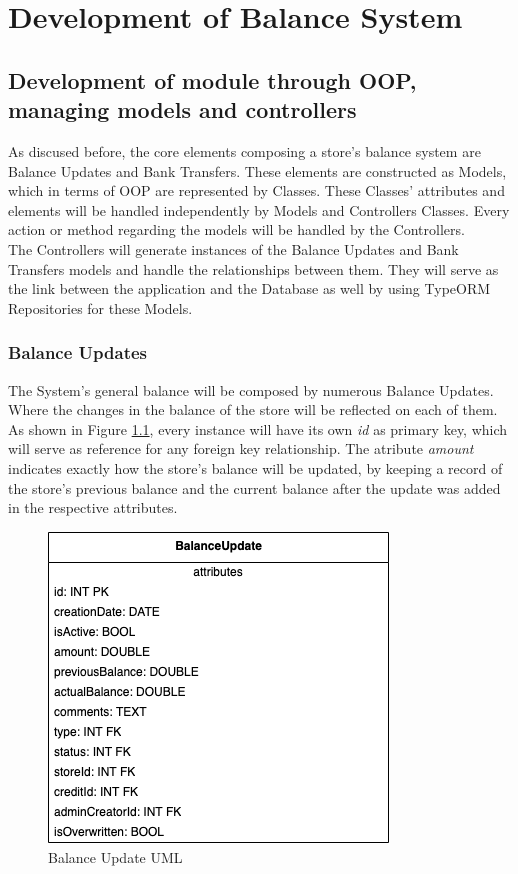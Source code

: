 \chapter{Development of Balance System}

\section{Development of module through OOP, managing models and controllers}

As discused before, the core elements composing a store's balance system are Balance Updates and Bank Transfers. These elements are constructed as Models, which in terms of OOP are represented by Classes. These Classes' attributes and elements will be handled independently by Models and Controllers Classes. Every action or method regarding the models will be handled by the Controllers.\\

The Controllers will generate instances of the Balance Updates and Bank Transfers models and handle the relationships between them. They will serve as the link between the application and the Database as well by using TypeORM Repositories for these Models.

\subsection{Balance Updates}

The System's general balance will be composed by numerous Balance Updates. Where the changes in the balance of the store will be reflected on each of them. As shown in Figure \ref{fig:uml_balance_update}, every instance will have its own \textit{id} as primary key, which will serve as reference for any foreign key relationship. The atribute \textit{amount} indicates exactly how the store's balance will be updated, by keeping a record of the store's previous balance and the current balance after the update was added in the respective attributes.

\begin{figure} [H]
    \centering
    \includegraphics[scale = 0.7]{assets/uml/BalanceUpdate.png}
    \caption{Balance Update UML}\label{fig:uml_balance_update}
\end{figure}

